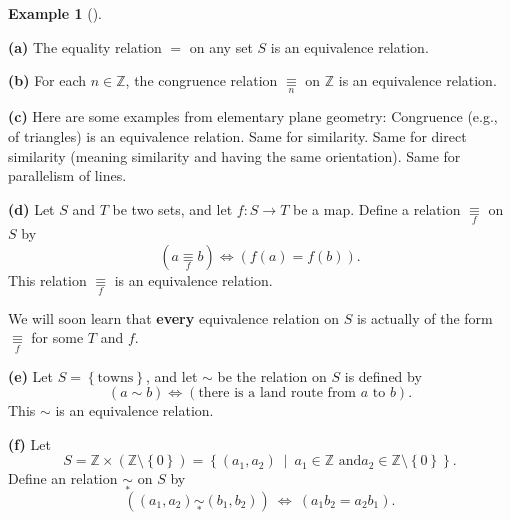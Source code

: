 \documentclass[numbers=enddot,12pt,final,onecolumn,notitlepage]{scrartcl}%
\numberwithin{exer}{subsection}
\theoremstyle{definition}
\newtheorem{exam}[theo]{Example}
\newenvironment{example}[1][]
{\begin{exam}[#1]\begin{leftbar}}
{\end{leftbar}\end{exam}}
\begin{document}
\begin{example}
\label{exa.equiv.eqrels1}\textbf{(a)} The equality relation $=$ on any set $S$
is an equivalence relation.

\textbf{(b)} For each $n\in\mathbb{Z}$, the congruence relation
$\underset{n}{\equiv}$ on $\mathbb{Z}$ is an equivalence relation.

\textbf{(c)} Here are some examples from elementary plane geometry: Congruence
(e.g., of triangles) is an equivalence relation. Same for similarity. Same for
direct similarity (meaning similarity and having the same orientation). Same
for parallelism of lines.

\textbf{(d)} Let $S$ and $T$ be two sets, and let $f:S\rightarrow T$ be a map.
Define a relation $\underset{f}{\equiv}$ on $S$ by%
\[
\left(  a\underset{f}{\equiv}b\right)  \Longleftrightarrow\left(  f\left(
a\right)  =f\left(  b\right)  \right)  .
\]
This relation $\underset{f}{\equiv}$ is an equivalence relation.

We will soon learn that \textbf{every} equivalence relation on $S$ is actually
of the form $\underset{f}{\equiv}$ for some $T$ and $f$.

\textbf{(e)} Let $S=\left\{  \text{towns}\right\}  $, and let $\sim$ be the
relation on $S$ is defined by%
\[
\left(  a\sim b\right)  \Longleftrightarrow\left(  \text{there is a land route
from }a\text{ to }b\right)  .
\]
This $\sim$ is an equivalence relation.

\textbf{(f)} Let
\[
S=\mathbb{Z}\times\left(  \mathbb{Z}\setminus\left\{  0\right\}  \right)
=\left\{  \left(  a_{1},a_{2}\right)  \ \mid\ a_{1}\in\mathbb{Z}\text{ and
}a_{2}\in\mathbb{Z}\setminus\left\{  0\right\}  \right\}  .
\]
Define an relation $\underset{\ast}{\sim}$ on $S$ by%
\[
\left(  \left(  a_{1},a_{2}\right)  \underset{\ast}{\sim}\left(  b_{1}%
,b_{2}\right)  \right)  \ \Longleftrightarrow\ \left(  a_{1}b_{2}=a_{2}%
b_{1}\right)  .
\]



\end{example}
\end{document}
